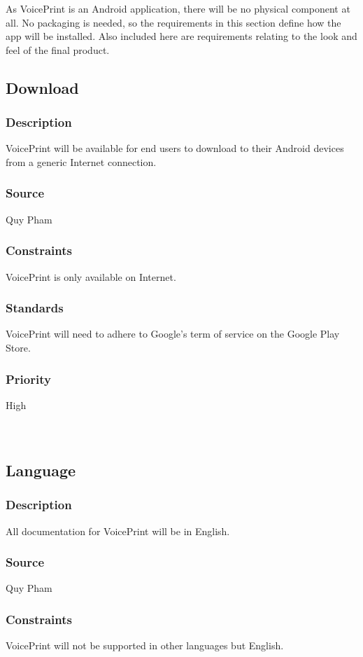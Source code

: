 As VoicePrint is an Android application, there will be no physical component at all. No packaging is needed, so the requirements in this section define how the app will be installed. Also included here are requirements relating to the look and feel of the final product.

\subsection{Download}
\subsubsection{Description}
VoicePrint will be available for end users to download to their Android devices from a generic Internet connection.
\subsubsection{Source}
Quy Pham
\subsubsection{Constraints}
VoicePrint is only available on Internet.
\subsubsection{Standards}
VoicePrint will need to adhere to Google's term of service on the Google Play Store. \cite{play.google}
\subsubsection{Priority}
High\\
\\
\\

\subsection{Language}
\subsubsection{Description}
All documentation for VoicePrint will be in English.
\subsubsection{Source}
Quy Pham
\subsubsection{Constraints}
VoicePrint will not be supported in other languages but English.
